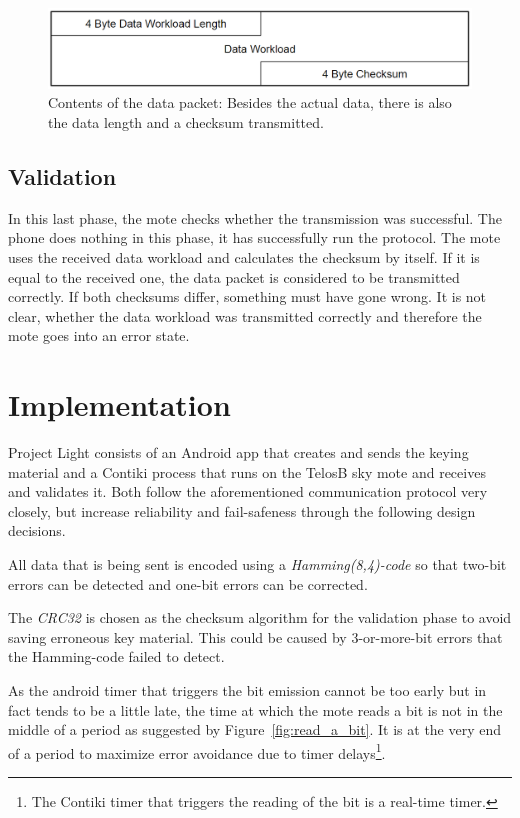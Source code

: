 \documentclass{sig-alternate} %
\begin{document}
\begin{figure}
	\centering
	\includegraphics[scale=.3]{images/data_packet.png}
	\caption{Contents of the data packet: Besides the actual data, there is also the data length and a checksum transmitted.}
	\label{fig:data_packet}
\end{figure}

\subsection{Validation}
\label{sub:validation}

In this last phase, the mote checks whether the transmission was successful.
The phone does nothing in this phase, it has successfully run the protocol.
The mote uses the received data workload and calculates the checksum by itself.
If it is equal to the received one, the data packet is considered to be transmitted correctly.
If both checksums differ, something must have gone wrong.
It is not clear, whether the data workload was transmitted correctly and therefore the mote goes into an error state.

\section{Implementation}
\label{sec:implementation}

Project Light consists of an Android app that creates and sends the keying material and a Contiki process that runs on the TelosB sky mote and receives and validates it.
Both follow the aforementioned communication protocol very closely, but increase reliability and fail-safeness through the following design decisions.

All data that is being sent is encoded using a \textit{Hamming(8,4)-code} so that two-bit errors can be detected and one-bit errors can be corrected.

The \textit{CRC32} is chosen as the checksum algorithm for the validation phase to avoid saving erroneous key material.
This could be caused by 3-or-more-bit errors that the Hamming-code failed to detect.

As the android timer that triggers the bit emission cannot be too early but in fact tends to be a little late\cite{mongia2010reliable}, the time at which the mote reads a bit is not in the middle of a period as suggested by Figure~\ref{fig:read_a_bit}.
It is at the very end of a period to maximize error avoidance due to timer delays\footnote{The Contiki timer that triggers the reading of the bit is a real-time timer.}.
\end{document}
